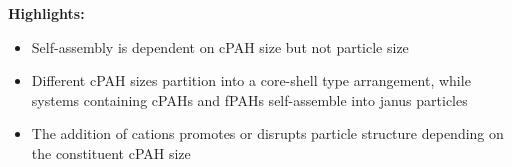 \documentclass[como,a4paper,12pt,final]{Classes/c4e-preprint}
\begin{document}
\textbf{Highlights:}

\begin{itemize}
\item Self-assembly is dependent on cPAH size but not particle size
\item Different cPAH sizes partition into a core-shell type arrangement, while systems containing cPAHs and fPAHs self-assemble into janus particles
\item The addition of cations promotes or disrupts particle structure depending on the constituent cPAH size
\end{itemize}

\vfill

\clearpage \setcounter{tocdepth}{3} \tableofcontents

\clearpage


\clearpage \appendix
{}


\clearpage \citeindexfalse

\end{document}
